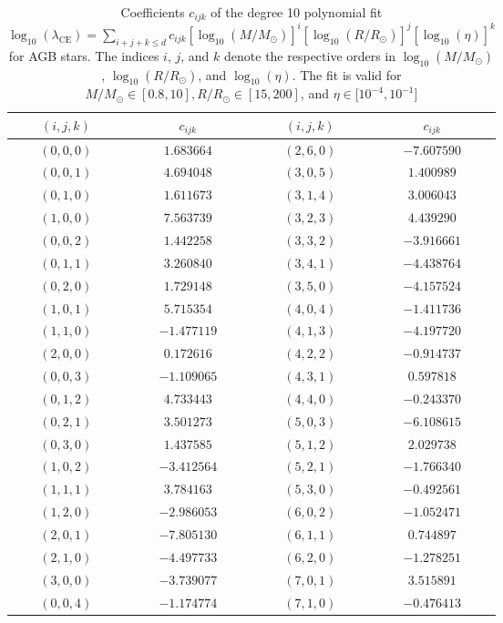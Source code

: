 \begin{table}
\centering
\caption{Coefficients $c_{ijk}$ of the degree 10 polynomial fit $\log_{10}(\lambda_{\mathrm{CE}})=\sum_{i+j+k\leq d}c_{ijk}\left[\log_{10}(M/M_\odot)\right]^i\left[\log_{10}(R/R_\odot)\right]^j\left[\log_{10}(\eta)\right]^k$ for AGB stars. The indices $i$, $j$, and $k$ denote the respective orders in $\log_{10}(M/M_\odot)$, $\log_{10}(R/R_\odot)$, and $\log_{10}(\eta)$. The fit is valid for $M/M_\odot\in[0.8,10], R/R_\odot\in[15,200]$, and $\eta\in[10^{-4},10^{-1}$]}
\label{tab:tab:lambda_ce_3d_coef_AGB}
\begin{tabular}{cc@{\qquad}cc}
\hline
$(i,j,k)$ & $c_{ijk}$ & $(i,j,k)$ & $c_{ijk}$ \\
\hline
$(0,0,0)$ & $1.683664$ & $(2,6,0)$ & $-7.607590$ \\
$(0,0,1)$ & $4.694048$ & $(3,0,5)$ & $1.400989$ \\
$(0,1,0)$ & $1.611673$ & $(3,1,4)$ & $3.006043$ \\
$(1,0,0)$ & $7.563739$ & $(3,2,3)$ & $4.439290$ \\
$(0,0,2)$ & $1.442258$ & $(3,3,2)$ & $-3.916661$ \\
$(0,1,1)$ & $3.260840$ & $(3,4,1)$ & $-4.438764$ \\
$(0,2,0)$ & $1.729148$ & $(3,5,0)$ & $-4.157524$ \\
$(1,0,1)$ & $5.715354$ & $(4,0,4)$ & $-1.411736$ \\
$(1,1,0)$ & $-1.477119$ & $(4,1,3)$ & $-4.197720$ \\
$(2,0,0)$ & $0.172616$ & $(4,2,2)$ & $-0.914737$ \\
$(0,0,3)$ & $-1.109065$ & $(4,3,1)$ & $0.597818$ \\
$(0,1,2)$ & $4.733443$ & $(4,4,0)$ & $-0.243370$ \\
$(0,2,1)$ & $3.501273$ & $(5,0,3)$ & $-6.108615$ \\
$(0,3,0)$ & $1.437585$ & $(5,1,2)$ & $2.029738$ \\
$(1,0,2)$ & $-3.412564$ & $(5,2,1)$ & $-1.766340$ \\
$(1,1,1)$ & $3.784163$ & $(5,3,0)$ & $-0.492561$ \\
$(1,2,0)$ & $-2.986053$ & $(6,0,2)$ & $-1.052471$ \\
$(2,0,1)$ & $-7.805130$ & $(6,1,1)$ & $0.744897$ \\
$(2,1,0)$ & $-4.497733$ & $(6,2,0)$ & $-1.278251$ \\
$(3,0,0)$ & $-3.739077$ & $(7,0,1)$ & $3.515891$ \\
$(0,0,4)$ & $-1.174774$ & $(7,1,0)$ & $-0.476413$ \\

\end{tabular}
\end{table}
